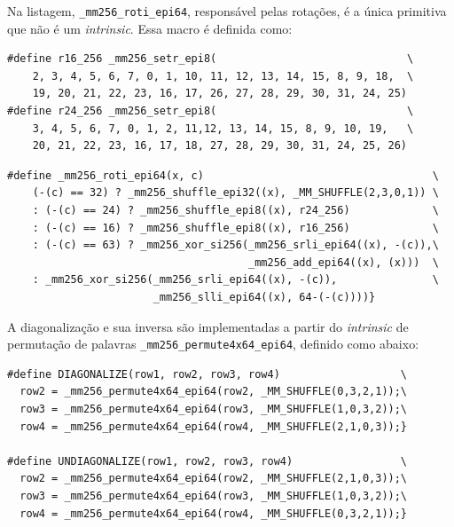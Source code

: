 \documentclass{article}
\begin{document}
Na listagem, \texttt{\_mm256\_roti\_epi64}, responsável pelas rotações, é a
única primitiva que não é um \emph{intrinsic}. Essa macro é definida como:

\begin{small}
\begin{verbatim}
#define r16_256 _mm256_setr_epi8(                              \
    2, 3, 4, 5, 6, 7, 0, 1, 10, 11, 12, 13, 14, 15, 8, 9, 18,  \
    19, 20, 21, 22, 23, 16, 17, 26, 27, 28, 29, 30, 31, 24, 25)
#define r24_256 _mm256_setr_epi8(                              \
    3, 4, 5, 6, 7, 0, 1, 2, 11,12, 13, 14, 15, 8, 9, 10, 19,   \
    20, 21, 22, 23, 16, 17, 18, 27, 28, 29, 30, 31, 24, 25, 26)
\end{verbatim}
\end{small}

\begin{small}
\begin{verbatim}
#define _mm256_roti_epi64(x, c)                                    \
    (-(c) == 32) ? _mm256_shuffle_epi32((x), _MM_SHUFFLE(2,3,0,1)) \
    : (-(c) == 24) ? _mm256_shuffle_epi8((x), r24_256)             \
    : (-(c) == 16) ? _mm256_shuffle_epi8((x), r16_256)             \
    : (-(c) == 63) ? _mm256_xor_si256(_mm256_srli_epi64((x), -(c)),\
                                      _mm256_add_epi64((x), (x)))  \
    : _mm256_xor_si256(_mm256_srli_epi64((x), -(c)),               \
                       _mm256_slli_epi64((x), 64-(-(c))))}
\end{verbatim}
\end{small}

A diagonalização e sua inversa são implementadas a partir do \emph{intrinsic}
de permutação de palavras \texttt{\_mm256\_permute4x64\_epi64}, definido como abaixo:

\begin{small}
\begin{verbatim}
#define DIAGONALIZE(row1, row2, row3, row4)                   \
  row2 = _mm256_permute4x64_epi64(row2, _MM_SHUFFLE(0,3,2,1));\
  row3 = _mm256_permute4x64_epi64(row3, _MM_SHUFFLE(1,0,3,2));\
  row4 = _mm256_permute4x64_epi64(row4, _MM_SHUFFLE(2,1,0,3));}

#define UNDIAGONALIZE(row1, row2, row3, row4)                 \
  row2 = _mm256_permute4x64_epi64(row2, _MM_SHUFFLE(2,1,0,3));\
  row3 = _mm256_permute4x64_epi64(row3, _MM_SHUFFLE(1,0,3,2));\
  row4 = _mm256_permute4x64_epi64(row4, _MM_SHUFFLE(0,3,2,1));}
\end{verbatim}
\end{small}
\end{document}
